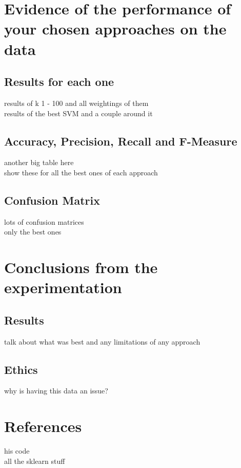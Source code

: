 \documentclass[paper=a4, fontsize=11pt]{scrartcl}
\numberwithin{equation}{section}		%
\numberwithin{figure}{section}			%
\numberwithin{table}{section}				%
\begin{document}
\section{Evidence of the performance of your chosen approaches on the data}

\subsection{Results for each one}

results of k 1 - 100 and all weightings of them\\
results of the best SVM and a couple around it

\subsection{Accuracy, Precision, Recall and F-Measure}

another big table here\\
show these for all the best ones of each approach

\subsection{Confusion Matrix}

lots of confusion matrices\\
only the best ones

\section{Conclusions from the experimentation}

\subsection{Results}

talk about what was best and any limitations of any approach

\subsection{Ethics}

why is having this data an issue?

\section{References}

his code\\
all the sklearn stuff

\end{document}
